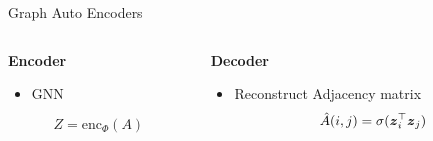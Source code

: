 \documentclass[11pt]{beamer}
\begin{document}
\begin{frame}{Graph Auto Encoders}
  \begin{columns}
    \begin{column}{.5\textwidth}
      \textbf{Encoder}
      \begin{itemize}
      \item GNN 
      \end{itemize}
      $$Z = \textrm{enc}_\Phi(A)$$
      
    \end{column}
    \begin{column}{.5\textwidth}
      \textbf{Decoder}
      \begin{itemize}
      \item Reconstruct Adjacency matrix
        $$\hat{A}(i,j) = \sigma({\boldsymbol{z}}_i^\top {\boldsymbol{z}}_j)$$
      \end{itemize}
      
    \end{column}
  \end{columns}
\end{frame}
\end{document}
